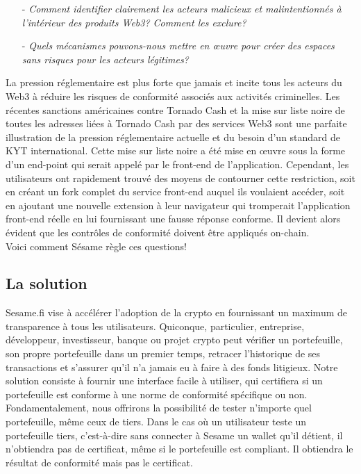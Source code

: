 ﻿\documentclass[a4paper]{article}
\begin{document}
\begin{itemize}
\item[-] {\it Comment identifier clairement les acteurs malicieux et malintentionnés à l’intérieur des produits Web3? Comment les exclure?}

\item[-] {\it Quels mécanismes pouvons-nous mettre en œuvre pour créer des espaces sans risques pour les acteurs légitimes?}
\end{itemize}

La pression réglementaire est plus forte que jamais et incite tous les acteurs du Web3 à réduire les risques de conformité associés aux activités criminelles. Les récentes sanctions américaines contre Tornado Cash et la mise sur liste noire de toutes les adresses liées à Tornado Cash par des services Web3 sont une parfaite illustration de la pression réglementaire actuelle et du besoin d'un standard de KYT international. Cette mise sur liste noire a été mise en œuvre sous la forme d'un end-point qui serait appelé par le front-end de l'application. Cependant, les utilisateurs ont rapidement trouvé des moyens de contourner cette restriction, soit en créant un fork complet du service front-end auquel ils voulaient accéder, soit en ajoutant une nouvelle extension à leur navigateur qui tromperait l'application front-end réelle en lui fournissant une fausse réponse conforme. Il devient alors évident que les contrôles de conformité doivent être appliqués on-chain. \\

Voici comment Sésame règle ces questions! 
\subsection{La solution}
Sesame.fi vise à accélérer l’adoption de la crypto en fournissant un maximum de transparence à tous les utilisateurs. Quiconque, particulier, entreprise, développeur, investisseur, banque ou projet crypto peut vérifier un portefeuille, son propre portefeuille dans un premier temps, retracer l’historique de ses transactions et s’assurer qu’il n’a jamais eu à faire à des fonds litigieux. Notre solution consiste à fournir une interface facile à utiliser, qui certifiera si un portefeuille est conforme à une norme de conformité spécifique ou non. \\

Fondamentalement, nous offrirons la possibilité de tester n'importe quel portefeuille, même ceux de tiers. Dans le cas où un utilisateur teste un portefeuille tiers, c'est-à-dire sans connecter  à Sesame un wallet qu’il détient, il n’obtiendra pas de certificat, même si le portefeuille est compliant. Il obtiendra le résultat de conformité mais pas le certificat. \\
\end{document}
